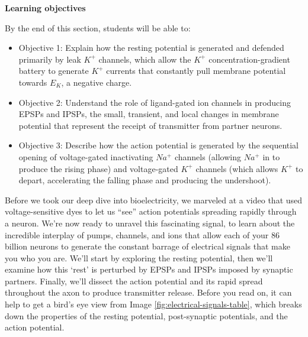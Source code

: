 \documentclass[
]{book}
\providecommand{\tightlist}{%
  \setlength{\itemsep}{0pt}\setlength{\parskip}{0pt}}
\begin{document}
\textbf{Learning objectives}

By the end of this section, students will be able to:

\begin{itemize}
\tightlist
\item
  Objective 1: Explain how the resting potential is generated and defended primarily by leak \(K^+\) channels, which allow the \(K^+\) concentration-gradient battery to generate \(K^+\) currents that constantly pull membrane potential towards \(E_{K}\), a negative charge.\\
\item
  Objective 2: Understand the role of ligand-gated ion channels in producing EPSPs and IPSPs, the small, transient, and local changes in membrane potential that represent the receipt of transmitter from partner neurons.\\
\item
  Objective 3: Describe how the action potential is generated by the sequential opening of voltage-gated inactivating \(Na^+\) channels (allowing \(Na^+\) in to produce the rising phase) and voltage-gated \(K^+\) channels (which allows \(K^+\) to depart, accelerating the falling phase and producing the undershoot).
\end{itemize}

Before we took our deep dive into bioelectricity, we marveled at a video that used voltage-sensitive dyes to let us ``see'' action potentials spreading rapidly through a neuron. We're now ready to unravel this fascinating signal, to learn about the incredible interplay of pumps, channels, and ions that allow each of your 86 billion neurons to generate the constant barrage of electrical signals that make you who you are. We'll start by exploring the resting potential, then we'll examine how this `rest' is perturbed by EPSPs and IPSPs imposed by synaptic partners. Finally, we'll dissect the action potential and its rapid spread throughout the axon to produce transmitter release. Before you read on, it can help to get a bird's eye view from Image \ref{fig:electrical-signals-table}, which breaks down the properties of the resting potential, post-synaptic potentials, and the action potential.
\end{document}
